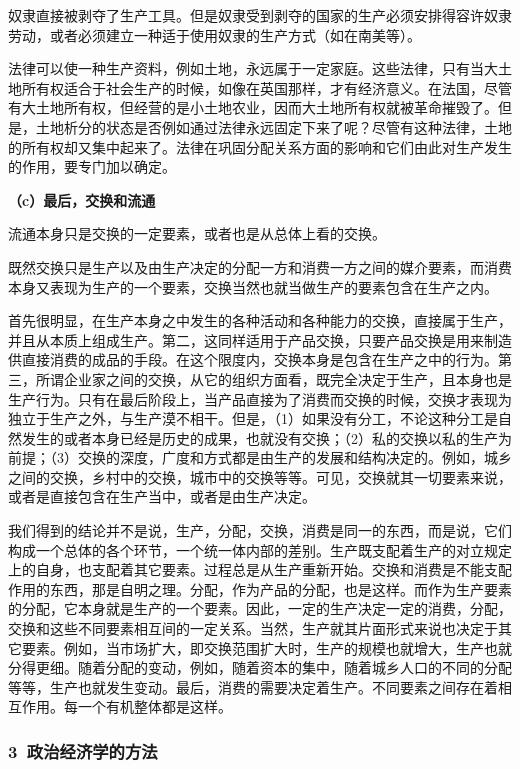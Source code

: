 \documentclass[a4paper,twoside,12pt,AutoFakeBold]{ctexart}
\begin{document}
奴隶直接被剥夺了生产工具。但是奴隶受到剥夺的国家的生产必须安排得容许奴隶劳动，或者必须建立一种适于使用奴隶的生产方式（如在南美等）。

法律可以使一种生产资料，例如土地，永远属于一定家庭。这些法律，只有当大土地所有权适合于社会生产的时候，如像在英国那样，才有经济意义。在法国，尽管有大土地所有权，但经营的是小土地农业，因而大土地所有权就被革命摧毁了。但是，土地析分的状态是否例如通过法律永远固定下来了呢？尽管有这种法律，土地的所有权却又集中起来了。法律在巩固分配关系方面的影响和它们由此对生产发生的作用，要专门加以确定。

\textbf{（c）最后，交换和流通}

流通本身只是交换的一定要素，或者也是从总体上看的交换。

既然交换只是生产以及由生产决定的分配一方和消费一方之间的媒介要素，而消费本身又表现为生产的一个要素，交换当然也就当做生产的要素包含在生产之内。

首先很明显，在生产本身之中发生的各种活动和各种能力的交换，直接属于生产，并且从本质上组成生产。第二，这同样适用于产品交换，只要产品交换是用来制造供直接消费的成品的手段。在这个限度内，交换本身是包含在生产之中的行为。第三，所谓企业家之间的交换，从它的组织方面看，既完全决定于生产，且本身也是生产行为。只有在最后阶段上，当产品直接为了消费而交换的时候，交换才表现为独立于生产之外，与生产漠不相干。但是，（1）如果没有分工，不论这种分工是自然发生的或者本身已经是历史的成果，也就没有交换；（2）私的交换以私的生产为前提；（3）交换的深度，广度和方式都是由生产的发展和结构决定的。例如，城乡之间的交换，乡村中的交换，城市中的交换等等。可见，交换就其一切要素来说，或者是直接包含在生产当中，或者是由生产决定。

我们得到的结论并不是说，生产，分配，交换，消费是同一的东西，而是说，它们构成一个总体的各个环节，一个统一体内部的差别。生产既支配着生产的对立规定上的自身，也支配着其它要素。过程总是从生产重新开始。交换和消费是不能支配作用的东西，那是自明之理。分配，作为产品的分配，也是这样。而作为生产要素的分配，它本身就是生产的一个要素。因此，一定的生产决定一定的消费，分配，交换和这些不同要素相互间的一定关系。当然，生产就其片面形式来说也决定于其它要素。例如，当市场扩大，即交换范围扩大时，生产的规模也就增大，生产也就分得更细。随着分配的变动，例如，随着资本的集中，随着城乡人口的不同的分配等等，生产也就发生变动。最后，消费的需要决定着生产。不同要素之间存在着相互作用。每一个有机整体都是这样。

\subsubsection{3~政治经济学的方法}
\end{document}
